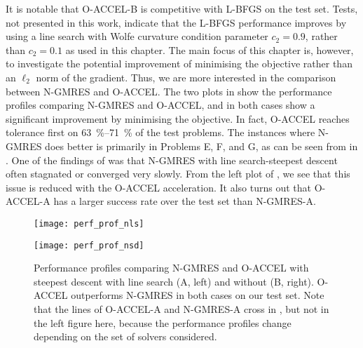 \documentclass[main.tex]{subfiles}
\begin{document}
It is notable that O-ACCEL-B is competitive with L-BFGS on the test
set. Tests, not presented in this work, indicate that the L-BFGS
performance improves by using a line search with Wolfe curvature
condition parameter $c_2=0.9$, rather than $c_2=0.1$ as used in this
chapter.  The main focus of this chapter is, however, to
investigate the potential improvement of minimising the objective
rather than an $\ell_2$ norm of the gradient. Thus, we are more
interested in the comparison between N-GMRES and O-ACCEL.  The two
plots in  show the performance profiles
comparing N-GMRES and O-ACCEL, and in both cases show a significant
improvement by minimising the objective. In fact, O-ACCEL reaches
tolerance first on \SIrange{63}{71}{\percent} of the test problems.
The instances where N-GMRES does better is primarily in Problems E, F,
and G, as can be seen from  in .  One of
the findings of \citet{sterck2013steepest} was that N-GMRES with line
search-steepest descent often stagnated or converged very slowly. From
the left plot of , we see that this issue
is reduced with the O-ACCEL acceleration. It also turns out that
O-ACCEL-A has a larger success rate over the test set than N-GMRES-A.
\begin{figure}[hbt]
  \centering
  \begin{minipage}{0.49\textwidth}
    \texttt{[image: perf\_prof\_nls]}
  \end{minipage}
  \hfill
  \begin{minipage}{0.49\textwidth}
    \texttt{[image: perf\_prof\_nsd]}
  \end{minipage}
  \caption[Performance profiles for N-GMRES and O-ACCEL on Problems A--G]{Performance profiles comparing N-GMRES and O-ACCEL with
    steepest descent with line search (A, left) and without (B,
    right).  O-ACCEL outperforms N-GMRES in both cases on our test
    set.
    Note that the lines of O-ACCEL-A and N-GMRES-A cross in
    , but not in the left figure here, because
    the performance profiles change depending on the set of solvers
    considered.
  }\label{fig:perf_prof_nls_nsd}
\end{figure}
\end{document}
